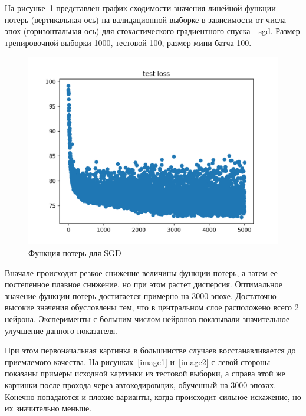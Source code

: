 \documentclass[oneside,final,12pt]{extreport}
\begin{document}
На рисунке \,\ref{loss_figure} представлен график сходимости значения линейной функции потерь (вертикальная ось) на валидационной выборке в зависимости от числа эпох (горизонтальная ось) для стохастического градиентного спуска - sgd. Размер тренировочной выборки 1000, тестовой 100, размер мини-батча 100.


\begin{figure}[th]
\includegraphics[width=1.0\textwidth]{Figure_2}
\caption{Функция потерь для SGD}
\label{loss_figure}
\end{figure}


Вначале происходит резкое снижение величины функции потерь, а затем ее постепенное плавное снижение, но при этом растет дисперсия. Оптимальное значение функции потерь достигается примерно на 3000 эпохе. Достаточно высокие значения обусловлены тем, что в центральном слое расположено всего 2 нейрона. Эксперименты с большим числом нейронов показывали значительное улучшение данного показателя.


При этом первоначальная картинка в большинстве случаев восстанавливается до приемлемого качества. На рисунках \,\ref{image1} и \,\ref{image2} с левой стороны показаны примеры исходной картинки из тестовой выборки, а справа этой же картинки после прохода через автокодировщик, обученный на 3000 эпохах. Конечно попадаются и плохие варианты, когда происходит сильное искажение, но их значительно меньше. 
\end{document}

